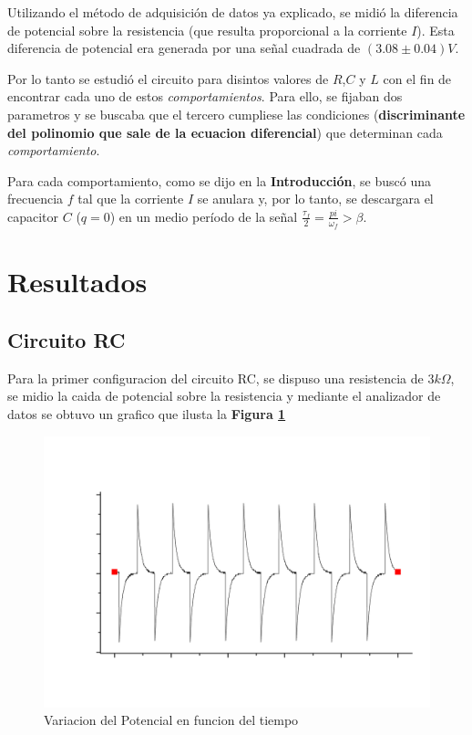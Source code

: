 \documentclass[11pt,a4paper]{article}
\begin{document}
Utilizando el método de adquisición de datos ya explicado, se midió la diferencia de potencial sobre la resistencia (que resulta proporcional a la corriente $I$). Esta diferencia de potencial era generada por una señal cuadrada de $(3.08 \pm 0.04)V$.

Por lo tanto se estudió el circuito para disintos valores de $R$,$C$ y $L$ con el fin de encontrar cada uno de estos \textit{comportamientos}. Para ello, se fijaban dos parametros y se buscaba que el tercero cumpliese las condiciones (\textbf{discriminante del polinomio que sale de la ecuacion diferencial}) que determinan cada \textit{comportamiento}.

Para cada comportamiento, como se dijo en la \textbf{Introducción}, se buscó una frecuencia $f$ tal que la corriente $I$ se anulara y, por lo tanto, se descargara el capacitor $C$ ($q=0$) en un medio período de la señal $\frac{\tau_f}{2} = \frac{pi}{\omega_f} > \beta$.



\section{Resultados}
\label{sec:discusion}

\subsection{Circuito RC}
Para la primer configuracion del circuito RC, se dispuso una resistencia de $3k\Omega$, se midio la caida de potencial sobre la resistencia y mediante el analizador de datos se obtuvo un grafico que ilusta la \textbf{Figura \ref{fig:RC-CR}}

\begin{figure}[H]
\centering
\includegraphics[scale=0.45]{RC-Caida_en_Resistencia}
  \caption{Variacion del Potencial en funcion del tiempo}
  \label{fig:RC-CR}
\end{figure}
\end{document}
